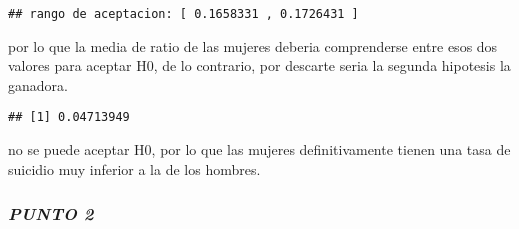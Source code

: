 \documentclass[]{article}
\newenvironment{Shaded}{\begin{snugshade}}{\end{snugshade}}
\newcommand{\KeywordTok}[1]{\textcolor[rgb]{0.13,0.29,0.53}{\textbf{#1}}}
\newcommand{\FloatTok}[1]{\textcolor[rgb]{0.00,0.00,0.81}{#1}}
\newcommand{\StringTok}[1]{\textcolor[rgb]{0.31,0.60,0.02}{#1}}
\newcommand{\CommentTok}[1]{\textcolor[rgb]{0.56,0.35,0.01}{\textit{#1}}}
\newcommand{\OperatorTok}[1]{\textcolor[rgb]{0.81,0.36,0.00}{\textbf{#1}}}
\newcommand{\NormalTok}[1]{#1}
\begin{document}
\begin{Shaded}
\end{Shaded}

\begin{verbatim}
## rango de aceptacion: [ 0.1658331 , 0.1726431 ]
\end{verbatim}

por lo que la media de ratio de las mujeres deberia comprenderse entre
esos dos valores para aceptar H0, de lo contrario, por descarte seria la
segunda hipotesis la ganadora.

\begin{Shaded}
\end{Shaded}

\begin{verbatim}
## [1] 0.04713949
\end{verbatim}

no se puede aceptar H0, por lo que las mujeres definitivamente tienen
una tasa de suicidio muy inferior a la de los hombres.

\subsubsection{\texorpdfstring{\textbf{\emph{PUNTO
2}}}{PUNTO 2}}\label{punto-2}
\end{document}
